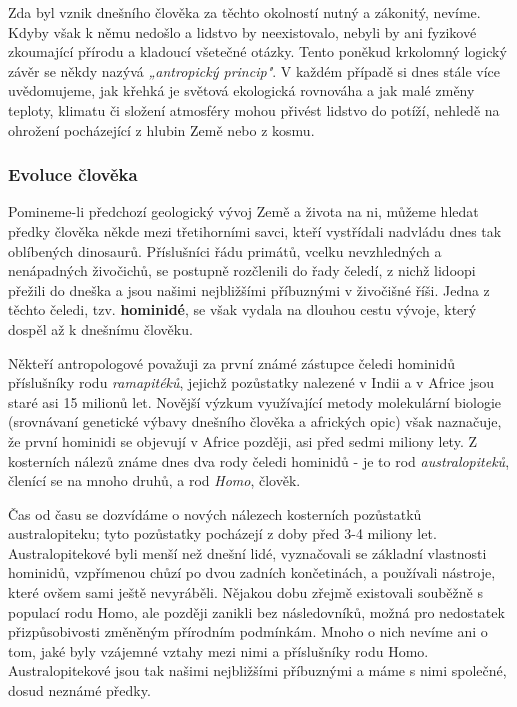       Zda byl vznik dnešního člověka za těchto okolností nutný a zákonitý, nevíme. Kdyby však k němu
      nedošlo a lidstvo by neexistovalo, nebyli by ani fyzikové zkoumající přírodu a kladoucí
      všetečné otázky. Tento poněkud krkolomný logický závěr se někdy nazývá \emph{„antropický
      princip"}. V každém případě si dnes stále více uvědomujeme, jak křehká je světová ekologická
      rovnováha a jak malé změny teploty, klimatu či složení atmosféry mohou přivést lidstvo do
      potíží, nehledě na ohrožení pocházející z hlubin Země nebo z kosmu.

      \subsubsection{Evoluce člověka}
        Pomineme-li předchozí geologický vývoj Země a života na ni, můžeme hledat předky člověka
        někde mezi třetihorními savci, kteří vystřídali nadvládu dnes tak oblíbených dinosaurů.
        Příslušníci řádu primátů, vcelku nevzhledných a nenápadných živočichů, se postupně
        rozčlenili do řady čeledí, z nichž lidoopi přežili do dneška a jsou našimi nejbližšími
        příbuznými v živočišné říši. Jedna z těchto čeledi, tzv. \textbf{hominidé}, se však vydala
        na dlouhou cestu vývoje, který dospěl až k dnešnímu člověku.

        Někteří antropologové považuji za první známé zástupce čeledi hominidů příslušníky rodu
        \emph{ramapitéků}, jejichž pozůstatky nalezené v Indii a v Africe jsou staré asi 15 milionů
        let. Novější výzkum využívající metody molekulární biologie (srovnávaní genetické výbavy
        dnešního člověka a afrických opic) však naznačuje, že první hominidi se objevují v Africe
        později, asi před sedmi miliony lety. Z kosterních nálezů známe dnes dva rody čeledi
        hominidů - je to rod \emph{australopiteků}, členící se na mnoho druhů, a rod \emph{Homo},
        člověk.

        Čas od času se dozvídáme o nových nálezech kosterních pozůstatků australopiteku; tyto
        pozůstatky pocházejí z doby před 3-4 miliony let. Australopitekové byli menší než dnešní
        lidé, vyznačovali se základní vlastnosti hominidů, vzpřímenou chůzí po dvou zadních
        končetinách, a používali nástroje, které ovšem sami ještě nevyráběli. Nějakou dobu zřejmě
        existovali souběžně s populací rodu Homo, ale později zanikli bez následovníků, možná pro
        nedostatek přizpůsobivosti změněným přírodním podmínkám. Mnoho o nich nevíme ani o tom, jaké
        byly vzájemné vztahy mezi nimi a příslušníky rodu Homo. Australopitekové jsou tak našimi
        nejbližšími příbuznými a máme s nimi společné, dosud neznámé předky.

